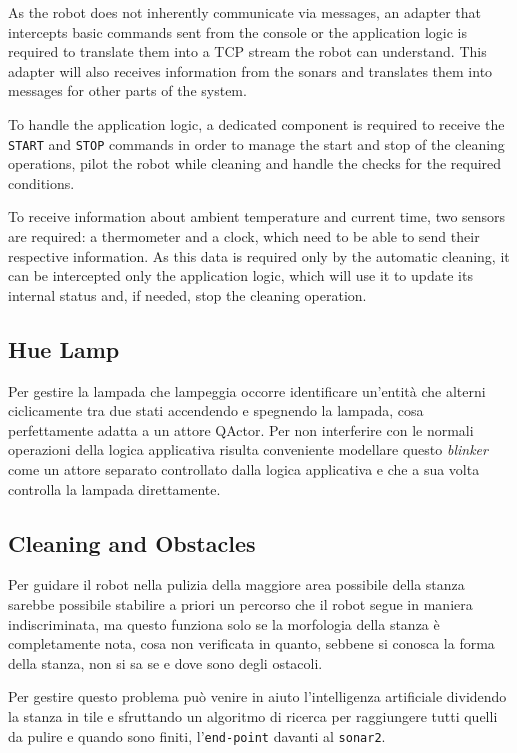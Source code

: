 As the robot does not inherently communicate via messages, an adapter that intercepts basic commands sent from the console or the application logic is required to translate them into a TCP stream the robot can understand. This adapter will also receives information from the sonars and translates them into messages for other parts of the system.

To handle the application logic, a dedicated component is required to receive the \texttt{START} and \texttt{STOP} commands in order to manage the start and stop of the cleaning operations, pilot the robot while cleaning and handle the checks for the required conditions.

To receive information about ambient temperature and current time, two sensors are required: a thermometer and a clock, which need to be able to send their respective information. As this data is required only by the automatic cleaning, it can be intercepted only the application logic, which will use it to update its internal status and, if needed, stop the cleaning operation.

\subsection{Hue Lamp}
Per gestire la lampada che lampeggia occorre identificare un'entità che alterni ciclicamente tra due stati accendendo e spegnendo la lampada, cosa perfettamente adatta a un attore QActor. Per non interferire con le normali operazioni della logica applicativa risulta conveniente modellare questo \textit{blinker} come un attore separato controllato dalla logica applicativa e che a sua volta controlla la lampada direttamente.

\subsection{Cleaning and Obstacles}
Per guidare il robot nella pulizia della maggiore area possibile della stanza sarebbe possibile stabilire a priori un percorso che il robot segue in maniera indiscriminata, ma questo funziona solo se la morfologia della stanza è completamente nota, cosa non verificata in quanto, sebbene si conosca la forma della stanza, non si sa se e dove sono degli ostacoli.

Per gestire questo problema può venire in aiuto l'intelligenza artificiale dividendo la stanza in tile e sfruttando un algoritmo di ricerca per raggiungere tutti quelli da pulire e quando sono finiti, l'\texttt{end-point} davanti al \texttt{sonar2}.

